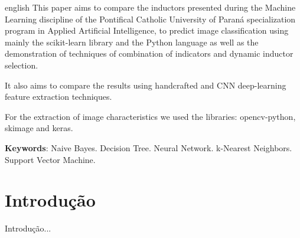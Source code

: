 \documentclass[
article,			%
11pt,				%
oneside,			%
a4paper,			%
english,			%
brazil,				%
sumario=tradicional
]{abntex2}
\begin{document}
	
	\renewcommand{\resumoname}{Abstract}
	\begin{resumoumacoluna}
		\begin{otherlanguage*}{english}
			This paper aims to compare the inductors presented during the Machine Learning discipline of the Pontifical Catholic University of Paraná specialization program in Applied Artificial Intelligence, to predict image classification using mainly the scikit-learn library and the Python language as well as the demonstration of techniques of combination of indicators and dynamic inductor selection.
			
			It also aims to compare the results using handcrafted and CNN deep-learning feature extraction techniques.
			
			For the extraction of image characteristics we used the libraries: opencv-python, skimage and keras.
			\vspace{\onelineskip}
			
			\noindent
			\textbf{Keywords}: Naive Bayes. Decision Tree. Neural Network. k-Nearest Neighbors. Support Vector Machine.
		\end{otherlanguage*}  
	\end{resumoumacoluna}
	
	
	
		
	
	\textual
	
	\section{Introdução}
	
Introdução...
	
\end{document}
